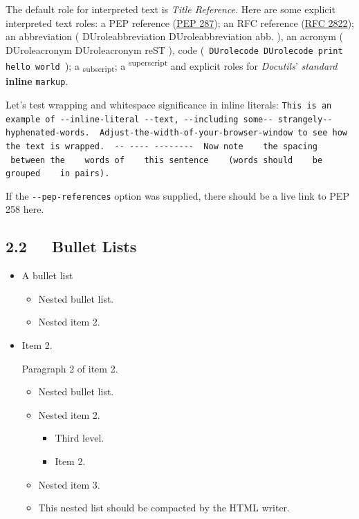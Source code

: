 \documentclass[a4paper]{article}
\providecommand*{\DUrole}[2]{%
  \ifcsname DUrole#1\endcsname%
    \csname DUrole#1\endcsname{#2}%
  \else%
    #2%
  \fi%
}
\providecommand*{\DUroletitlereference}[1]{\textsl{#1}}
\begin{document}
The default role for interpreted text is \DUroletitlereference{Title Reference}.  Here are
some explicit interpreted text roles: a PEP reference (\href{https://peps.python.org/pep-0287}{PEP 287}); an
RFC reference (\href{https://tools.ietf.org/html/rfc2822.html}{RFC 2822}); an abbreviation (\DUrole{abbreviation}{abb.}), an acronym
(\DUrole{acronym}{reST}), code (\texttt{\DUrole{code}{print \textquotedbl{}hello world\textquotedbl{}}}); a \textsubscript{subscript};
a \textsuperscript{superscript} and explicit roles for \DUroletitlereference{Docutils}’
\emph{standard} \textbf{inline} \texttt{markup}.


Let’s test wrapping and whitespace significance in inline literals:
\texttt{This is an example of -{}-inline-literal -{}-text, -{}-including some-{}-
strangely-{}-hyphenated-words. ~Adjust-the-width-of-your-browser-window
to see how the text is wrapped. ~-{}- -{}-{}-{}- -{}-{}-{}-{}-{}-{}-{}- ~Now note ~ ~the
spacing ~ ~between the ~ ~words of ~ ~this sentence ~ ~(words
should ~ ~be grouped ~ ~in pairs).}

If the \texttt{-{}-pep-references} option was supplied, there should be a
live link to PEP 258 here.


\subsection{2.2   Bullet Lists%
  \label{bullet-lists}%
}

\begin{itemize}
\item A bullet list

\begin{itemize}
\item Nested bullet list.

\item Nested item 2.
\end{itemize}

\item Item 2.

Paragraph 2 of item 2.

\begin{itemize}
\item Nested bullet list.

\item Nested item 2.

\begin{itemize}
\item Third level.

\item Item 2.
\end{itemize}

\item Nested item 3.

\item This nested list should be compacted by the HTML writer.
%
\label{target}
\end{itemize}
\end{itemize}
\end{document}
